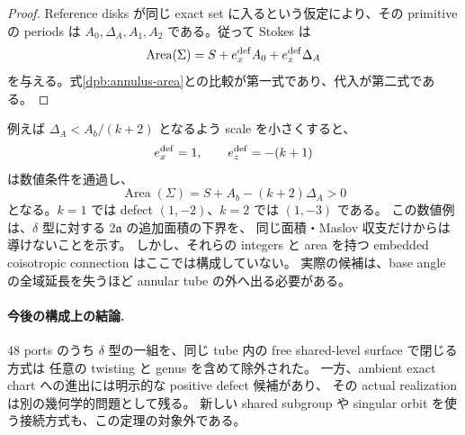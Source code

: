 \begin{proof}
Reference disks が同じ exact set に入るという仮定により、その primitive の periods は
$A_0,\Delta_A,A_1,A_2$ である。従って Stokes は
\[
 \operatorname{Area}(\Sigma)=S+e_x^{\rm def}A_0+e_z^{\rm def}\Delta_A
\]
を与える。式\eqref{dpb:annulus-area}との比較が第一式であり、代入が第二式である。
\end{proof}

例えば $\Delta_A<A_b/(k+2)$ となるよう scale を小さくすると、
\[
 e_x^{\rm def}=1,\qquad e_z^{\rm def}=-(k+1)
\]
は数値条件を通過し、
\[
 \operatorname{Area}(\Sigma)=S+A_b-(k+2)\Delta_A>0
\]
となる。$k=1$ では defect $(1,-2)$、$k=2$ では $(1,-3)$ である。
この数値例は、$\delta$ 型に対する $2\mathfrak a$ の追加面積の下界を、
同じ面積・Maslov 収支だけからは導けないことを示す。
しかし、それらの integers と area を持つ embedded coisotropic connection はここでは構成していない。
実際の候補は、base angle の全域延長を失うほど annular tube の外へ出る必要がある。

\paragraph{今後の構成上の結論.}
48 ports のうち $\delta$ 型の一組を、同じ tube 内の free shared-level surface で閉じる方式は
任意の twisting と genus を含めて除外された。
一方、ambient exact chart への進出には明示的な positive defect 候補があり、
その actual realization は別の幾何学的問題として残る。
新しい shared subgroup や singular orbit を使う接続方式も、この定理の対象外である。
